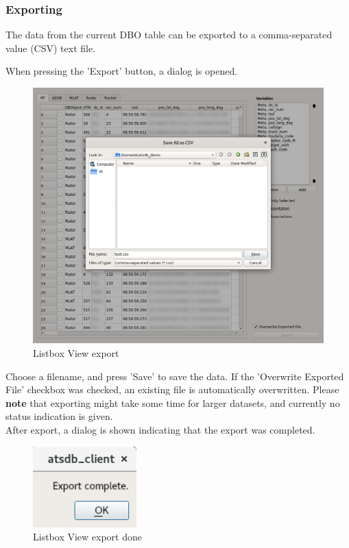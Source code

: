\subsubsection{Exporting}
\label{sec:exporting}

The data from the current DBO table can be exported to a comma-separated value (CSV) text file. 

When pressing the 'Export' button, a dialog is opened.

\begin{figure}[H]
    \hspace*{-2cm}
    \includegraphics[width=18cm,frame]{../screenshots/listbox_export.png}
  \caption{Listbox View export}
  \label{fig:listbox_export}
\end{figure}

Choose a filename, and press 'Save' to save the data. If the 'Overwrite Exported File' checkbox was checked, an existing file is automatically overwritten. Please \textbf{note} that exporting might take some time for larger datasets, and currently no status indication is given.\\

After export, a dialog is shown indicating that the export was completed.

\begin{figure}[H]
    \includegraphics[width=4cm,frame]{../screenshots/listbox_exported.png}
  \caption{Listbox View export done}
  \label{fig:listbox_exported}
\end{figure}

